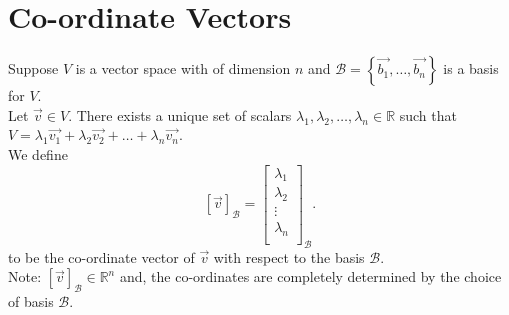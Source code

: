 \documentclass{report}
\begin{document}
       \section{Co-ordinate Vectors }
       Suppose $ V$ is a vector space with of dimension $ n$ and $ \mathcal{B} = \left\{ \vec{ b_1} ,\ldots , \vec{ b_n}  \right\} $ is a basis for $ V$.\\
       Let $ \vec{ v} \in V$. There exists a unique set of scalars $ \lambda_1, \lambda_2, \ldots , \lambda_n \in \mathbb{R}$ such that $ V = \lambda_1 \vec{ v_1} + \lambda_2 \vec{ v_2} + \ldots + \lambda _n \vec{ v_n} $.\\
       We define \[
        \left[ \vec{ v}  \right]_{ \mathcal{B}}  = \begin{bmatrix}
        \lambda_1\\
        \lambda_2\\
        \vdots\\
        \lambda_n\\
        \end{bmatrix} _{ \mathcal{B}} 
       .\] 
       to be the co-ordinate vector of $ \vec{ v} $ with respect to the basis $ \mathcal{B}$.\\
       Note: $ \left[ \vec{ v}  \right]_{ \mathcal{B}} \in \mathbb{R} ^{n}$ and, the co-ordinates are completely determined by the choice of basis $ \mathcal{B}$.\\
\end{document}
